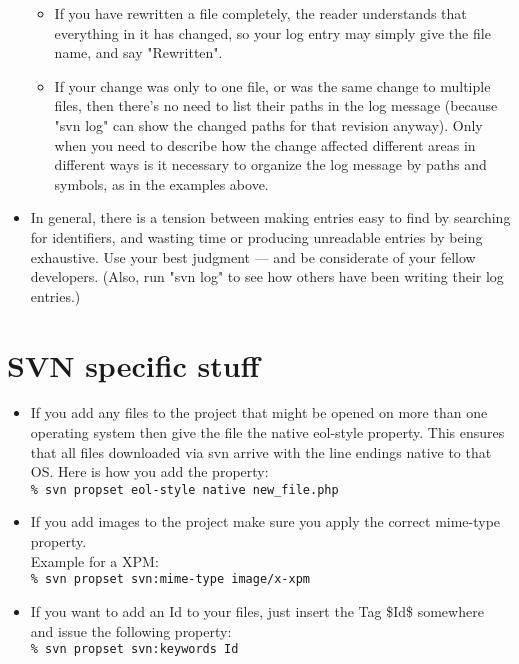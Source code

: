\begin{itemize}
\begin{itemize}
        \item If you have rewritten a file completely, the reader understands
          that everything in it has changed, so your log entry may simply
          give the file name, and say "Rewritten".

        \item If your change was only to one file, or was the same change to
          multiple files, then there's no need to list their paths in the
          log message (because "svn log" can show the changed paths for
          that revision anyway).  Only when you need to describe how the
          change affected different areas in different ways is it
          necessary to organize the log message by paths and symbols, as
          in the examples above.
        \end{itemize}

    \item In general, there is a tension between making entries easy to find by
        searching for identifiers, and wasting time or producing unreadable
        entries by being exhaustive.  Use your best judgment --- and be
        considerate of your fellow developers.  (Also, run "svn log" to see
        how others have been writing their log entries.)
    \end{itemize}

\section{SVN specific stuff}
    \begin{itemize}
        \item If you add any files to the project that might be opened on more than one operating system then give the file
            the native eol-style property.  This ensures that all files downloaded via svn arrive with the line endings
            native to that OS.  Here is how you add the property:\\
            \texttt{\% svn propset eol-style native new\_file.php}

        \item If you add images to the project make sure you apply the correct  mime-type property.\\
            Example for a XPM:\\
            \texttt{\% svn propset svn:mime-type image/x-xpm}

        \item If you want to add an Id to your files, just insert the Tag \$Id\$ somewhere and issue the following property:\\
            \texttt{\% svn propset svn:keywords Id}

    \end{itemize}



